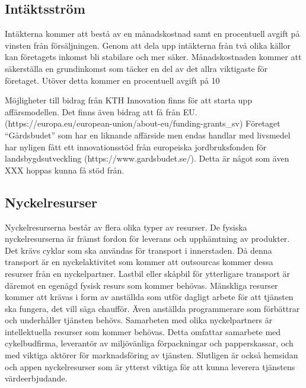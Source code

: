 \documentclass[10pt,a4paper,oneside]{article}
\begin{document}
\subsection{Intäktsström}
Intäkterna kommer att bestå av en månadskostnad samt en procentuell avgift på vinsten från försäljningen. Genom att dela upp intäkterna från två olika källor kan företagets inkomst bli stabilare och mer säker. Månadskostnaden kommer att säkerställa en grundinkomst som täcker en del av det allra viktigaste för företaget. Utöver detta kommer en procentuell avgift på 10%

Möjligheter till bidrag från KTH Innovation finns för att starta upp affärsmodellen. Det finns även bidrag att få från EU. (https://europa.eu/european-union/about-eu/funding-grants_sv) Företaget “Gårdsbudet” som har en liknande affärside men endas handlar med livsmedel har nyligen fått ett innovationsstöd från europeiska jordbruksfonden för landsbygdsutveckling (https://www.gardsbudet.se/). Detta är något som även XXX hoppas kunna få stöd från.  

\subsection{Nyckelresurser}
Nyckelresurserna består av flera olika typer av resurser. De fysiska nyckelresurserna är främst fordon för leverans och upphämtning av produkter. Det krävs cyklar som ska användas för transport i innerstaden. Då denna transport är en nyckelaktivitet som kommer att outsourcas kommer dessa resurser från en nyckelpartner. Lastbil eller skåpbil för ytterligare transport är däremot en egenägd fysisk resurs som kommer behövas. Mänskliga resurser kommer att krävas i form av anställda som utför dagligt arbete för att tjänsten ska fungera, det vill säga chaufför. Även anställda programmerare som förbättrar och underhåller tjänsten behövs. Samarbeten med olika nyckelpartners är intellektuella resurser som kommer behövas. Detta omfattar samarbete med cykelbudfirma, leverantör av miljövänliga förpackningar och papperskassar, och med viktiga aktörer för marknadsföring av tjänsten.  Slutligen är också hemsidan och appen nyckelresurser som är ytterst viktiga för att kunna leverera tjänstens värdeerbjudande. 
\end{document}
